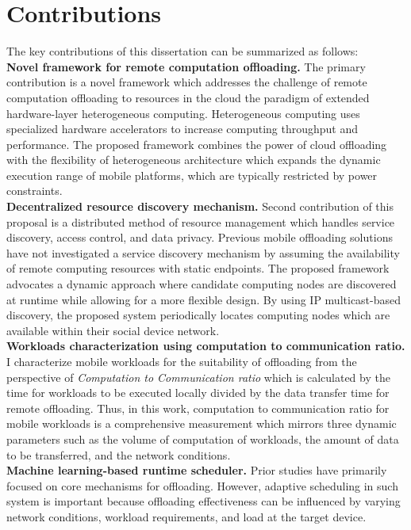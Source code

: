 \section{Contributions}
\label{intro:contributions}
The key contributions of this dissertation can be summarized as
follows:\\
%
{\bf Novel framework for remote computation offloading.} The primary
contribution is a novel framework which addresses the challenge of
remote computation offloading to resources in the cloud the paradigm of
extended hardware-layer heterogeneous computing.
%
Heterogeneous computing uses specialized hardware accelerators to
increase computing throughput and performance.
%
The proposed framework combines the power of cloud offloading with the
flexibility of heterogeneous architecture which expands the dynamic
execution range of mobile platforms, which are typically restricted by
power constraints.\\
%
{\bf Decentralized resource discovery mechanism.} Second
contribution of this proposal is a distributed method of resource
management which handles service discovery, access control, and data
privacy.
%
Previous mobile offloading solutions have not investigated a service
discovery mechanism by assuming the availability of remote computing
resources with static endpoints.
%
The proposed framework advocates a dynamic approach where candidate
computing nodes are discovered at runtime while allowing for a more
flexible design.
%
By using IP multicast-based discovery, the proposed system periodically
locates computing nodes which are available within their social device
network.\\
%
{\bf Workloads characterization using computation to communication
ratio.} 
%
I characterize mobile workloads for the suitability of offloading from
the perspective of {\it Computation to Communication ratio} which is
calculated by the time for workloads to be executed locally divided by
the data transfer time for remote offloading.
%
Thus, in this work, computation to communication ratio for mobile
workloads is a comprehensive measurement which mirrors three dynamic
parameters such as the volume of computation of workloads, the amount of
data to be transferred, and the network conditions.\\
%
{\bf Machine learning-based runtime scheduler.} Prior studies have
primarily focused on core mechanisms for offloading.
%
However, adaptive scheduling in such system is important because
offloading effectiveness can be influenced by varying network
conditions, workload requirements, and load at the target device.
